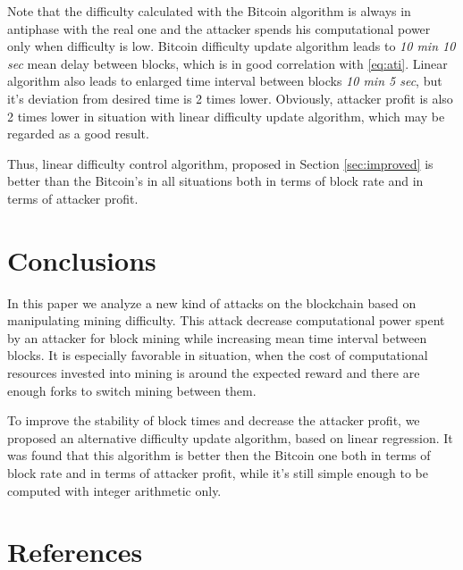 \documentclass[number,preprint,review]{elsarticle}
\begin{document}
Note that the difficulty calculated with the Bitcoin algorithm is always in antiphase with the real one and the attacker spends his computational power only when difficulty is low.
Bitcoin difficulty update algorithm leads to \textit{10 min 10 sec} mean delay between blocks, which is in good correlation with \ref{eq:ati}.
Linear algorithm also leads to enlarged time interval between blocks  \textit{10 min 5 sec}, but it's deviation from desired time is 2 times lower.
Obviously, attacker profit is also 2 times lower in situation with linear difficulty update algorithm, which may be regarded as a good result.

Thus, linear difficulty control algorithm, proposed in Section \ref{sec:improved} is better than the Bitcoin's in all situations both in terms of block rate and in terms of attacker profit.

\section{Conclusions}
\label{sec:concl}

In this paper we analyze a new kind of attacks on the blockchain based on manipulating mining difficulty.
This attack decrease computational power spent by an attacker for block mining while increasing mean time interval between blocks.
It is especially favorable in situation, when the cost of computational resources invested into mining is around the expected reward and there are enough forks to switch mining between them.

To improve the stability of block times and decrease the attacker profit, we proposed an alternative difficulty update algorithm, based on linear regression.
It was found that this algorithm is better then the Bitcoin one both in terms of block rate and in terms of attacker profit, while it's still simple enough to be computed with integer arithmetic only.

\section*{References}



\end{document}
